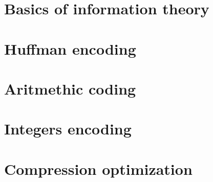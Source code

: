 \documentclass[moon, colormath]{lectures2}
\begin{document}

    \section{Basics of information theory} 
    

    \section{Huffman encoding}
    

    \section{Aritmethic coding}
    

    \section{Integers encoding}
    

    \section{Compression optimization}
    
    \clearpage\printbibliography
    \clearpage\printglossaries
\end{document}
